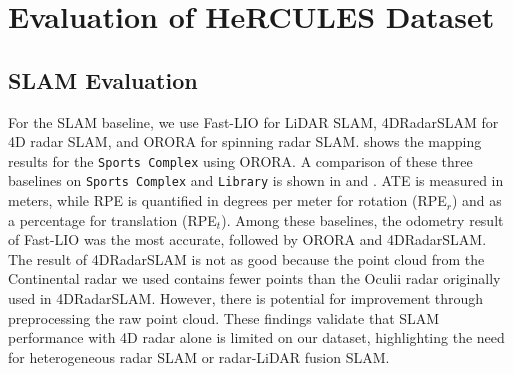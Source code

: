\section{Evaluation of HeRCULES Dataset}
\label{sec:evaluation}





\subsection{SLAM Evaluation}
For the \ac{SLAM} baseline, we use Fast-LIO \cite{xu2021fast} for \ac{LiDAR} {SLAM}, 4DRadarSLAM \cite{zhang20234dradarslam} for 4D radar \ac{SLAM}, and ORORA \cite{lim2023orora} for spinning radar \ac{SLAM}.  shows the mapping results for the \texttt{Sports Complex} using ORORA. A comparison of these three baselines on \texttt{Sports Complex} and \texttt{Library} is shown in   and  . \ac{ATE} is measured in meters, while \ac{RPE} is quantified in degrees per meter for rotation (RPE$_r$) and as a percentage for translation (RPE$_t$). Among these baselines, the odometry result of Fast-LIO was the most accurate, followed by ORORA and 4DRadarSLAM. The result of 4DRadarSLAM is not as good because the point cloud from the Continental radar we used contains fewer points than the Oculii radar originally used in 4DRadarSLAM. However, there is potential for improvement through preprocessing the raw point cloud. These findings validate that \ac{SLAM} performance with 4D radar alone is limited on our dataset, highlighting the need for heterogeneous radar \ac{SLAM} or radar-\ac{LiDAR} fusion \ac{SLAM}.


